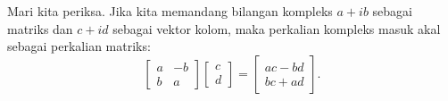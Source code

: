 
Mari kita periksa.
Jika kita memandang bilangan kompleks $a+ib$ sebagai matriks
dan $c+id$ sebagai vektor kolom,
maka perkalian kompleks masuk akal sebagai perkalian matriks:
\begin{equation*}
\begin{bmatrix}
a & -b \\
b & a
\end{bmatrix}
\begin{bmatrix}
c \\
d 
\end{bmatrix}
=
\begin{bmatrix}
ac-bd \\
bc+ad
\end{bmatrix} .
\end{equation*}
